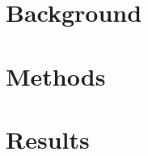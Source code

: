 \documentclass{bmcart}
\begin{document}

% 



\section{Background}\label{sec:intro}



\section{Methods}\label{sec:meth}









% 


% 
% 
% 


\section{Results}\label{sec:6}

\end{document}
